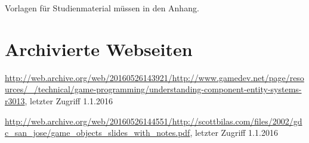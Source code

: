 \begin{appendices}
Vorlagen für Studienmaterial müssen in den Anhang. 

\section{Archivierte Webseiten}
\sloppy
\url{http://web.archive.org/web/20160526143921/http://www.gamedev.net/page/resources/_/technical/game-programming/understanding-component-entity-systems-r3013}, letzter Zugriff 1.1.2016

\url{http://web.archive.org/web/20160526144551/http://scottbilas.com/files/2002/gdc_san_jose/game_objects_slides_with_notes.pdf}, letzter Zugriff 1.1.2016

\end{appendices}
